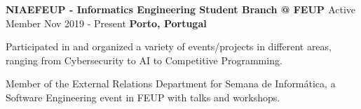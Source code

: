 \begin{cventries}
  \cventry
     {\textbf{NIAEFEUP - Informatics Engineering Student Branch @ FEUP \href{https://ni.fe.up.pt/}{\faExternalLink}}} %
    {Active Member} %
    {Nov 2019 - Present} %
    {\textbf{Porto, Portugal}} %
    {
      \begin{cvitems} %
        \item {Participated in and organized a variety of events/projects in different areas, ranging from Cybersecurity to AI to Competitive Programming.}
        \item {Member of the External Relations Department for Semana de Informática, a Software Engineering event in FEUP with talks and workshops.}
      \end{cvitems}
    }

\end{cventries}

